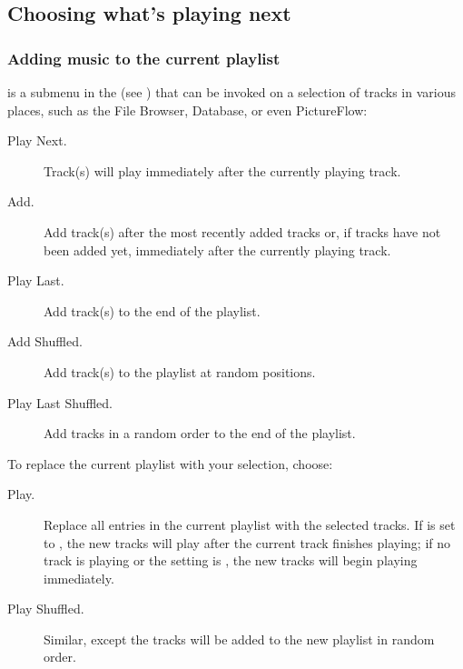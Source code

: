 \subsection{Choosing what's playing next}

\subsubsection{\label{ref:playingnext_submenu}Adding music to the current playlist}
 is a submenu in the  (see
) that can be invoked on a selection of tracks in various
places, such as the File Browser, Database, or even PictureFlow:

\begin{description}
\item [Play Next.] Track(s) will play immediately after the currently playing track.

\item [Add.] Add track(s) after the most recently added tracks or, if tracks
have not been added yet, immediately after the currently playing track.

\item [Play Last.] Add track(s) to the end of the playlist.

\item [Add Shuffled.] Add track(s) to the playlist at random positions.

\item [Play Last Shuffled.] Add tracks in a random order to the end of the playlist.
\end{description}

To replace the current playlist with your selection, choose:

\begin{description}
\item [Play.] Replace all entries in the current playlist with the selected
  tracks. If  is set to
  , the new tracks will play after the current track finishes
  playing; if no track is playing or the setting is , the new
  tracks will begin playing immediately.

\item [Play Shuffled.] Similar, except the tracks will be added to the new
  playlist in random order.
\end{description}

